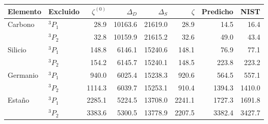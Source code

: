 \begin{tabular}{llrrrrrr}
    \toprule
    Elemento & Excluido & $\zeta^{(0)}$ & $\Delta_D$ & $\Delta_S$ & $\zeta$ & Predicho & NIST \\
    \midrule
    Carbono & $^3P_1$ & 28.9 & 10163.6 & 21619.0 & 28.9 & 14.5 & 16.4 \\
     & $^3P_2$ & 32.8 & 10159.9 & 21615.2 & 32.6 & 49.0 & 43.4 \\
    \midrule
    Silicio & $^3P_1$ & 148.8 & 6146.1 & 15240.6 & 148.1 & 76.9 & 77.1 \\
     & $^3P_2$ & 154.2 & 6145.7 & 15240.1 & 148.5 & 223.8 & 223.2 \\
    \midrule
    Germanio & $^3P_1$ & 940.0 & 6025.4 & 15238.3 & 920.6 & 564.5 & 557.1 \\
     & $^3P_2$ & 1114.3 & 6039.7 & 15253.1 & 910.4 & 1394.3 & 1410.0 \\
    \midrule
    Estaño & $^3P_1$ & 2285.1 & 5224.5 & 13708.0 & 2241.1 & 1727.3 & 1691.8 \\
     & $^3P_2$ & 3383.6 & 5300.5 & 13778.9 & 2207.5 & 3382.4 & 3427.7 \\
    \bottomrule
\end{tabular}

